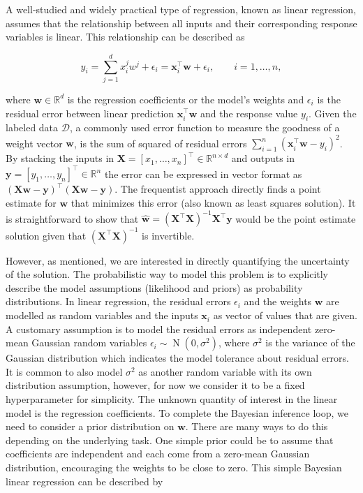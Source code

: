 \documentclass[dissertation,math,vertlayout,pdfa,colorlinks]{aaltoseries}
\newcommand{\bw}{\bm{w}}
\newcommand{\bX}{\bm{X}}
\newcommand{\by}{\bm{y}}
\newcommand{\bD}{\mathcal{D}}
\DeclareMathOperator{\normalpdf}{N}
\newcommand{\tp}{^{\top}}
\begin{document}
A well-studied and widely practical type of regression, known as linear regression, assumes that the relationship between all inputs and their corresponding response variables is linear. This relationship can be described as 

\begin{equation*}
y_i= \sum_{j=1}^{d}x_{i}^{j} w^{j}+\epsilon_i=\bm{x}_i\tp\bw+\epsilon_i, \qquad i=1,\ldots,n, 
\end{equation*}

\noindent where $\bw \in \mathbb{R}^d$ is the regression coefficients or the model's weights and $\epsilon_i$ is the residual error between linear prediction $\bm{x}_i\tp\bw$ and the response value $y_i$. Given the labeled data $\bD$, a commonly used error function to measure the goodness of a  weight vector $\bw$, is the sum of squared of residual errors $\sum_{i=1}^n(\bm{x}_i\tp\bw- y_i)^2$. By stacking the inputs in $\bX = [x_1,\ldots,x_n]\tp \in \mathbb{R}^{n\times d}$ and outputs in $\by = [y_1,\ldots,y_n]\tp \in \mathbb{R}^n$ the error can be expressed in vector format as $(\bX\bw- \by)\tp(\bX\bw- \by)$. The frequentist approach directly finds a point estimate for $\bw$ that minimizes this error (also known as least squares solution). It is straightforward to show that $\hat{\bw} = (\bX \tp \bX)^{-1}\bX\tp \by$  would be the point estimate solution given that $(\bX \tp \bX)^{-1}$ is invertible.  

However, as mentioned, we are interested in directly quantifying the uncertainty of the solution. The probabilistic way to model this problem is to explicitly describe the model assumptions (likelihood and priors) as probability distributions. In linear regression, the residual errors $\epsilon_i$ and the weights $\bw$ are modelled as random variables and the inputs $\bm{x}_i$ as vector of values that are given. A customary assumption is to model the residual errors as independent zero-mean Gaussian random variables $\epsilon_i \sim \normalpdf(0,\sigma^2)$, where $\sigma^2$ is the variance of the Gaussian distribution which indicates the model tolerance about residual errors. It is common to also model $\sigma^2$ as another random variable with its own distribution assumption, however, for now we consider it to be a fixed hyperparameter for simplicity. The unknown quantity of interest in the linear model is the regression coefficients. To complete the Bayesian inference loop, we need to consider a prior distribution on $\bw$. There are many ways to do this depending on the underlying task. One simple prior could be to assume that coefficients are independent and each come from a zero-mean Gaussian distribution, encouraging the weights to be close to zero. This simple Bayesian linear regression can be described by
\end{document}
